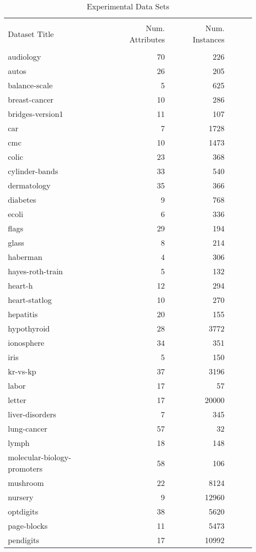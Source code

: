 {\centering \footnotesize \begin{longtable}{lrr@{\hspace{0.1cm}}cr@{\hspace{0.1cm}}c}
\caption{\label{dsets} Experimental Data Sets}
\\
\hline\\
Dataset Title & Num. Attributes & Num. Instances\\
\hline\\
audiology & 70 & 226\\
autos & 26 & 205\\
balance-scale & 5 & 625\\
breast-cancer & 10 & 286\\
bridges-version1 & 11 & 107\\
car & 7 & 1728\\
cmc & 10 & 1473\\
colic & 23 & 368\\
cylinder-bands & 33 & 540\\
dermatology & 35 & 366\\
diabetes & 9 & 768\\
ecoli & 6 & 336\\
flags & 29 & 194\\
glass & 8 & 214\\
haberman & 4 & 306\\
hayes-roth-train & 5 & 132\\
heart-h & 12 & 294\\
heart-statlog & 10 & 270\\
hepatitis & 20 & 155\\
hypothyroid & 28 & 3772\\
ionosphere & 34 & 351\\
iris & 5 & 150\\
kr-vs-kp & 37 & 3196\\
labor & 17 & 57\\
letter & 17 & 20000\\
liver-disorders & 7 & 345\\
lung-cancer & 57 & 32\\
lymph & 18 & 148\\
molecular-biology-promoters & 58 & 106\\
mushroom & 22 & 8124\\
nursery & 9 & 12960\\
optdigits & 38 & 5620\\
page-blocks & 11 & 5473\\
pendigits & 17 & 10992\\

\end{longtable}}
